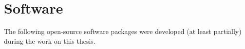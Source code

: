 \chapter*{Software}
The following open-source software packages were developed (at least partially) during the work
on this thesis.

\begin{refsection}[ownsoft]
    \small
    \nocite{*} %
    \printbibliography[heading=none]
\end{refsection}
